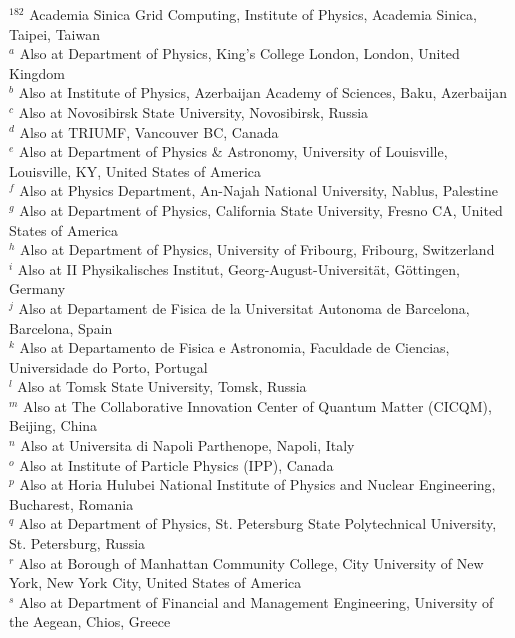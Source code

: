 \begin{flushleft}
$^{182}$ Academia Sinica Grid Computing, Institute of Physics, Academia Sinica, Taipei, Taiwan\\
$^{a}$ Also at Department of Physics, King's College London, London, United Kingdom\\
$^{b}$ Also at Institute of Physics, Azerbaijan Academy of Sciences, Baku, Azerbaijan\\
$^{c}$ Also at Novosibirsk State University, Novosibirsk, Russia\\
$^{d}$ Also at TRIUMF, Vancouver BC, Canada\\
$^{e}$ Also at Department of Physics {\&} Astronomy, University of Louisville, Louisville, KY, United States of America\\
$^{f}$ Also at Physics Department, An-Najah National University, Nablus, Palestine\\
$^{g}$ Also at Department of Physics, California State University, Fresno CA, United States of America\\
$^{h}$ Also at Department of Physics, University of Fribourg, Fribourg, Switzerland\\
$^{i}$ Also at II Physikalisches Institut, Georg-August-Universit{\"a}t, G{\"o}ttingen, Germany\\
$^{j}$ Also at Departament de Fisica de la Universitat Autonoma de Barcelona, Barcelona, Spain\\
$^{k}$ Also at Departamento de Fisica e Astronomia, Faculdade de Ciencias, Universidade do Porto, Portugal\\
$^{l}$ Also at Tomsk State University, Tomsk, Russia\\
$^{m}$ Also at The Collaborative Innovation Center of Quantum Matter (CICQM), Beijing, China\\
$^{n}$ Also at Universita di Napoli Parthenope, Napoli, Italy\\
$^{o}$ Also at Institute of Particle Physics (IPP), Canada\\
$^{p}$ Also at Horia Hulubei National Institute of Physics and Nuclear Engineering, Bucharest, Romania\\
$^{q}$ Also at Department of Physics, St. Petersburg State Polytechnical University, St. Petersburg, Russia\\
$^{r}$ Also at Borough of Manhattan Community College, City University of New York, New York City, United States of America\\
$^{s}$ Also at Department of Financial and Management Engineering, University of the Aegean, Chios, Greece\\

\end{flushleft}
